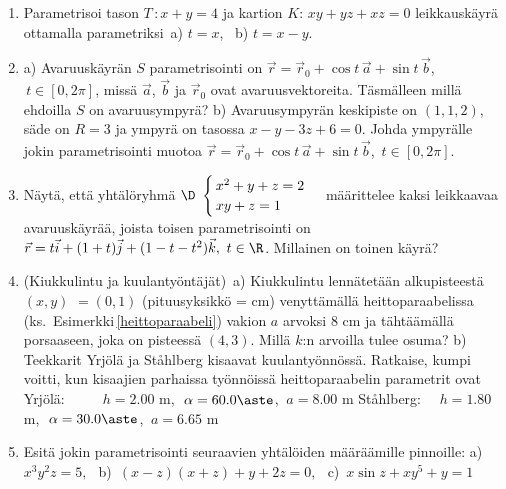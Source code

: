 \begin{enumerate}
\item
Parametrisoi tason $T\,:x+y=4$ ja kartion $K:\,xy+yz+xz=0$ leikkauskäyrä ottamalla
parametriksi\, a) $t=x$, \ b) $t=x-y$.

\item
a) Avaruuskäyrän $S$ parametrisointi on $\vec r = \vec r_0+\cos t\,\vec a+\sin t\,\vec b$,
$\,t\in[0,2\pi]$, missä $\vec a$, $\vec b$ ja $\vec r_0$ ovat avaruusvektoreita. Täsmälleen
millä ehdoilla $S$ on avaruusympyrä?
\vspace{1mm}\newline
b) Avaruusympyrän keskipiste on $(1,1,2)$, säde on $R=3$ ja ympyrä on tasossa $x-y-3z+6=0$.
Johda ympyrälle jokin parametrisointi muotoa $\vec r=\vec r_0+\cos t\,\vec a+\sin t\,\vec b$,
$\,t\in[0,2\pi]$.

\item
Näytä, että yhtälöryhmä
$\D \ \begin{cases} \,x^2+y+z=2 \\ \,xy+z=1 \end{cases} $ \vspace{1mm}\newline
määrittelee kaksi leikkaavaa avaruuskäyrää, joista toisen parametrisointi on
$\vec r=t\vec i+(1+t)\vec j+(1-t-t^2)\vec k,\ t\in\R$. Millainen on toinen käyrä?

\item {} (Kiukkulintu ja kuulantyöntäjät)\, 
a) Kiukkulintu lennätetään alkupisteestä $(x,y)$ $=(0,1)$ (pituusyksikkö = cm) venyttämällä 
heittoparaabelissa (ks.\ Esimerkki\,\ref{heittoparaabeli}) vakion $a$ arvoksi $8$ cm ja
tähtäämällä porsaaseen, joka on pisteessä $(4,3)$. Millä $k$:n arvoilla tulee
osuma? \vspace{1mm}\newline 
b) Teekkarit Yrjölä ja Ståhlberg kisaavat kuulantyönnössä. Ratkaise, kumpi voitti, kun
kisaajien parhaissa työnnöissä heittoparaabelin parametrit ovat \newline
Yrjölä:   $\,\ \qquad h=2.00$ m, $\ \alpha=60.0\aste$, $\ a=8.00$ m \newline
Ståhlberg: $\quad h=1.80$ m, $\ \alpha=30.0\aste$, $\ a=6.65$ m

\item
Esitä jokin parametrisointi seuraavien yhtälöiden määräämille pinnoille: \newline
a)\, $x^3y^2z=5,\,\ $ b)\, $(x-z)(x+z)+y+2z=0,\,\ $ c)\, $x\sin z+xy^5+y=1$


\end{enumerate}
